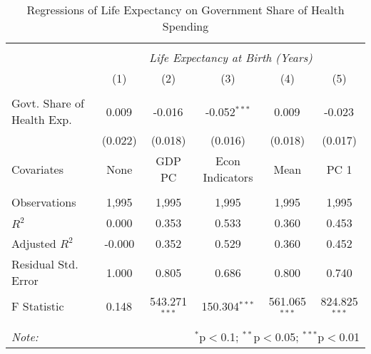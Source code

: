 \begin{table}[!htbp] \centering
  \caption{Regressions of Life Expectancy on Government Share of Health Spending \label{main_regs}}
\begin{tabular}{@{\extracolsep{5pt}}lccccc}
\\[-1.8ex]\hline
\hline \\[-1.8ex]
& \multicolumn{5}{c}{\textit{Life Expectancy at Birth (Years)}} \
\cr \
\\[-1.8ex] & (1) & (2) & (3) & (4) & (5) \\
\hline \\[-1.8ex]
 Govt. Share of Health Exp. & 0.009$^{}$ & -0.016$^{}$ & -0.052$^{***}$ & 0.009$^{}$ & -0.023$^{}$ \\
  & (0.022) & (0.018) & (0.016) & (0.018) & (0.017) \\
 Covariates & None & GDP PC & Econ Indicators & Mean & PC 1 \\
\hline \\[-1.8ex]
 Observations & 1,995 & 1,995 & 1,995 & 1,995 & 1,995 \\
 $R^2$ & 0.000 & 0.353 & 0.533 & 0.360 & 0.453 \\
 Adjusted $R^2$ & -0.000 & 0.352 & 0.529 & 0.360 & 0.452 \\
 Residual Std. Error & 1.000 & 0.805 & 0.686 & 0.800 & 0.740  \\
 F Statistic & 0.148$^{}$  & 543.271$^{***}$  & 150.304$^{***}$  & 561.065$^{***}$  & 824.825$^{***}$  \\
\hline
\hline \\[-1.8ex]
\textit{Note:} & \multicolumn{5}{r}{$^{*}$p$<$0.1; $^{**}$p$<$0.05; $^{***}$p$<$0.01} \\
\end{tabular}
\end{table}